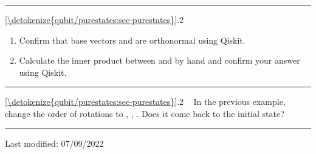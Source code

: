 \documentclass[letterpaper,10pt,english]{jupyterBook}
\begin{document}
\bigskip\hrule\bigskip


\sphinxAtStartPar
{} \hyperref[\detokenize{qubit/purestates:sec-purestates}]{\ref{\detokenize{qubit/purestates:sec-purestates}}}.2
\begin{enumerate}
%
\item {}
\sphinxAtStartPar
Confirm that base vectors  and  are orthonormal using Qiskit.

\item {}
\sphinxAtStartPar
Calculate the inner product between  and  by hand and confirm your answer using Qiskit.

\end{enumerate}


\bigskip\hrule\bigskip


\sphinxAtStartPar
{} \hyperref[\detokenize{qubit/purestates:sec-purestates}]{\ref{\detokenize{qubit/purestates:sec-purestates}}}.2    In the previous example, change the order of rotations to , , .  Does it come back to the initial state?


\bigskip\hrule\bigskip


\sphinxAtStartPar
Last modified: 07/09/2022

\sphinxstepscope
\end{document}
